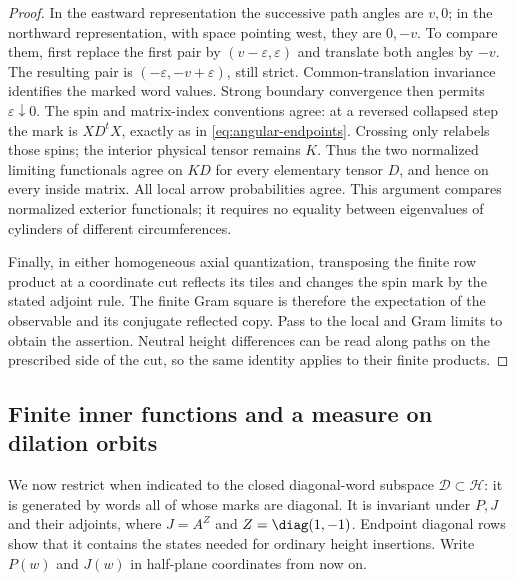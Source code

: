 \begin{proof}
In the eastward representation the successive path angles are $v,0$;
in the northward representation, with space pointing west, they are
$0,-v$.  To compare them, first replace the first pair by
$(v-\varepsilon,\varepsilon)$ and translate both angles by $-v$.
The resulting pair is $(-\varepsilon,-v+\varepsilon)$, still strict.
Common-translation invariance identifies the marked word values.
Strong boundary convergence then permits $\varepsilon\downarrow0$.
The spin and matrix-index conventions agree: at a reversed collapsed
step the mark is $XD^tX$, exactly as in
\eqref{eq:angular-endpoints}.  Crossing only relabels those spins; the
interior physical tensor remains $K$.  Thus the two normalized limiting
functionals agree on $KD$ for every elementary tensor $D$, and hence on
every inside matrix.  All local arrow probabilities agree.  This
argument compares normalized exterior functionals; it requires no
equality between eigenvalues of cylinders of different circumferences.

Finally, in either homogeneous axial quantization, transposing the
finite row product at a coordinate cut reflects its tiles and changes
the spin mark by the stated adjoint rule.  The finite Gram square is
therefore the expectation of the observable and its conjugate reflected
copy.  Pass to the local and Gram limits to obtain the assertion.
Neutral height differences can be read along paths on the prescribed
side of the cut, so the same identity applies to their finite products.
\end{proof}

\subsection{Finite inner functions and a measure on dilation orbits}

We now restrict when indicated to the closed diagonal-word subspace
$\mathcal D\subset\mathcal H$: it is generated by words all of whose
marks are diagonal.  It is invariant under $P,J$ and their adjoints,
where $J=A^Z$ and $Z=\diag(1,-1)$.  Endpoint diagonal rows show that it
contains the states needed for ordinary height insertions.  Write
$P(w)$ and $J(w)$ in half-plane coordinates from now on.


